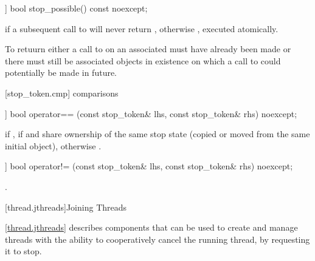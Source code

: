 {%
\begin{itemdecl}
[[nodiscard]] bool stop_possible() const noexcept;
\end{itemdecl}
\begin{itemdescr}
  \pnum\returns {} if a subsequent call to  will never return ,
                otherwise , executed atomically.
                \begin{note}To retuurn  either a call to 
                  on an associated  must have already been made or there
                  must still be associated  objects in existence on which
                  a call to  could potentially be made in future.
                \end{note}
\end{itemdescr}


[stop_token.cmp]{ comparisons}

%
\begin{itemdecl}
[[nodiscard]] bool operator== (const stop_token& lhs, const stop_token& rhs) noexcept;
\end{itemdecl}
\begin{itemdescr}
  \pnum\returns {} if ,
                 if  and  share ownership
                of the same stop state
                (copied or moved from the same initial  object),
                otherwise .
\end{itemdescr}

%
\begin{itemdecl}
[[nodiscard]] bool operator!= (const stop_token& lhs, const stop_token& rhs) noexcept;
\end{itemdecl}
\begin{itemdescr}
  \pnum\returns {}.
\end{itemdescr}


\clearpage

[thread.jthreads]{Joining Threads}

\pnum
\ref{thread.jthreads} describes components that can be used to create and manage threads
with the ability to
cooperatively cancel the running thread, by requesting it to stop.

}
